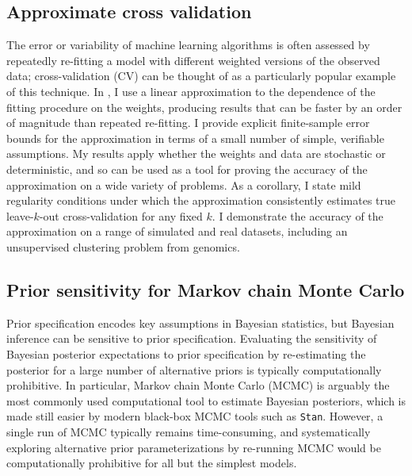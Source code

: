\subsection{Approximate cross validation}
%
The error or variability of machine learning algorithms is often assessed by
repeatedly re-fitting a model with different weighted versions of the observed
data; cross-validation (CV) can be thought of as a particularly popular example
of this technique.
%
In \citet{giordano:2019:ij}, I use a linear approximation to the dependence of
the fitting procedure on the weights, producing results that can be faster by an
order of magnitude than repeated re-fitting. I provide explicit finite-sample
error bounds for the approximation in terms of a small number of simple,
verifiable assumptions.  My results apply whether the weights and data are
stochastic or deterministic, and so can be used as a tool for proving the
accuracy of the approximation on a wide variety of problems. As a
corollary, I state mild regularity conditions under which the approximation
consistently estimates true leave-$k$-out cross-validation for any fixed $k$. I
demonstrate the accuracy of the approximation on a range of simulated and real
datasets, including an unsupervised clustering problem from genomics.


\subsection{Prior sensitivity for Markov chain Monte Carlo}
%
Prior specification encodes key assumptions in Bayesian statistics, but Bayesian
inference can be sensitive to prior specification.  Evaluating the sensitivity
of Bayesian posterior expectations to prior specification by re-estimating the
posterior for a large number of alternative priors is typically computationally
prohibitive.  In particular, Markov chain Monte Carlo (MCMC) is arguably the
most commonly used computational tool to estimate Bayesian posteriors, which is
made still easier by modern black-box MCMC tools such as \texttt{Stan}.
However, a single run of MCMC typically remains time-consuming, and
systematically exploring alternative prior parameterizations by re-running MCMC
would be computationally prohibitive for all but the simplest models.


